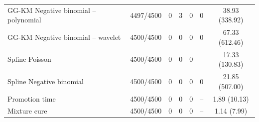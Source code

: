 \begin{table}[p]
{\begin{tabular}{lcccccc}
GG-KM Negative binomial -- polynomial & 4497/4500 & 0 & 3 & 0 & 0 & 38.93 (338.92) \\
GG-KM Negative binomial -- wavelet & 4500/4500 & 0 & 0 & 0 & 0 & 67.33 (612.46) \\
\hline
Spline Poisson & 4500/4500 & 0 & 0 & 0 & -- & 17.33 (130.83) \\
Spline Negative binomial & 4500/4500 & 0 & 0 & 0 & 0 & 21.85 (507.00) \\
Promotion time & 4500/4500 & 0 & 0 & 0 & -- & 1.89 (10.13) \\
Mixture cure & 4500/4500 & 0 & 0 & 0 & -- & 1.14 (7.99) \\
\hline
\end{tabular}%
}
\end{table}
